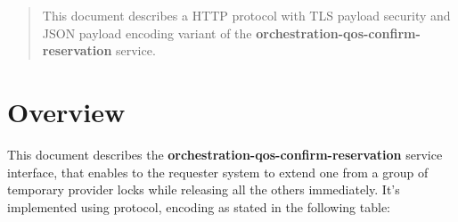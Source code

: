 \documentclass[a4paper]{arrowhead}
\begin{document}
\ArrowheadDate{\today}
\ArrowheadSetup

\begin{center}
  \vspace*{1cm}
  \huge{\arrowtitle}

  \vspace*{0.2cm}
  \LARGE{\arrowtype}
  \vspace*{1cm}
\end{center}

  \vspace*{\fill}


  \vspace*{1cm}
  \vspace*{\fill}

  \begin{abstract}
    This document describes a HTTP protocol with TLS payload
    security and JSON payload encoding variant of the \textbf{orchestration-qos-confirm-reservation} service.
  \end{abstract}
  \vspace*{1cm}

\newpage

\tableofcontents
\newpage

\section{Overview}
\label{sec:overview}

This document describes the \textbf{orchestration-qos-confirm-reservation} service interface, that enables to the requester system to extend one from a group of temporary provider locks while releasing all the others immediately. It's implemented using protocol, encoding as stated in the following table:
\end{document}
